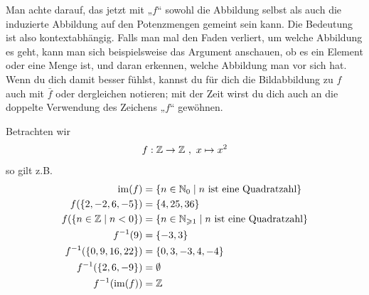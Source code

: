 \begin{bem}
	Man achte darauf, das jetzt mit „$f$“ sowohl die Abbildung selbst als auch die induzierte Abbildung auf den Potenzmengen gemeint sein kann. Die Bedeutung ist also kontextabhängig. Falls man mal den Faden verliert, um welche Abbildung es geht, kann man sich beispielsweise das Argument anschauen, ob es ein Element oder eine Menge ist, und daran erkennen, welche Abbildung man vor sich hat. \\[0.5em]
	Wenn du dich damit besser fühlst, kannst du für dich die Bildabbildung zu $f$ auch mit $\bar{f}$ oder dergleichen notieren; mit der Zeit wirst du dich auch an die doppelte Verwendung des Zeichens „$f$“ gewöhnen.
\end{bem}
\begin{bsp}
	Betrachten wir
	\begin{align*}
    f: {\mathbb Z} \to {\mathbb Z} \ ,\ x \mapsto x^2
	\end{align*}
	so gilt z.B.
\begin{align*}
 \im(f) & = \{n\in \Nz_0 \mid n\ \text{ist eine Quadratzahl} \} \\
 f( \{2,-2,6,-5\}) & = \{4,25,36\} \\
 f(\{n\in \Zz \mid n < 0  \}) & = \{n\in \Nz_{\geq 1} \mid n\ \text{ist eine Quadratzahl} \} \\
  f^{-1}(9) & = \{-3,3\} \\
 f^{-1}(\{0,9,16,22\}) & = \{0,3,-3,4,-4\} \\
 f^{-1}(\{2,6,-9\}) & = \emptyset \\
 f^{-1}(\im(f)) & = \Zz
\end{align*}
\end{bsp}

